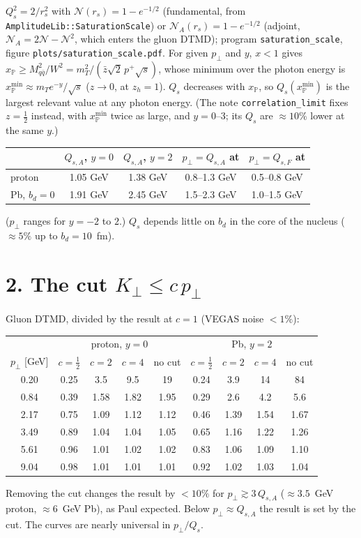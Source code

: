 \documentclass[12pt]{article}
\newcommand{\xpo}{x_{\mathbb{P}}}
\begin{document}
$Q_s^2=2/r_s^2$ with $\mathcal{N}(r_s)=1-e^{-1/2}$ (fundamental, from
\texttt{AmplitudeLib::}\allowbreak\texttt{SaturationScale}) or $\mathcal{N}_A(r_s)=1-e^{-1/2}$ (adjoint, $\mathcal{N}_A=2\mathcal{N}-\mathcal{N}^2$, which enters the
gluon DTMD); program \texttt{saturation\_scale}, figure \texttt{plots/saturation\_scale.pdf}.
For given $p_\perp$ and $y$, $x<1$ gives $\xpo\geq M_{q\bar q}^2/W^2=m_T^2/(\bar z\sqrt2\,p^+\sqrt{s})$, whose
minimum over the photon energy is $\xpo^{\min}\approx m_Te^{-y}/\sqrt{s}$ ($z\to0$, at $z_h=1$). $Q_s$
decreases with $\xpo$, so $Q_s(\xpo^{\min})$ is the largest relevant value at any photon energy. (The note
\texttt{correlation\_limit} fixes $z=\tfrac12$ instead, with $\xpo^{\min}$ twice as large, and $y=0$--3;
its $Q_s$ are $\approx10\%$ lower at the same $y$.)
\begin{center}
\begin{tabular}{lcccc}
\toprule
 & $Q_{s,A}$, $y=0$ & $Q_{s,A}$, $y=2$ & $p_\perp=Q_{s,A}$ at & $p_\perp=Q_{s,F}$ at \\
\midrule
proton     & 1.05 GeV & 1.38 GeV & 0.8--1.3 GeV & 0.5--0.8 GeV \\
Pb, $b_d=0$ & 1.91 GeV & 2.45 GeV & 1.5--2.3 GeV & 1.0--1.5 GeV \\
\bottomrule
\end{tabular}
\end{center}
($p_\perp$ ranges for $y=-2$ to $2$.) $Q_s$ depends little on $b_d$ in the core of the nucleus
($\approx5\%$ up to $b_d=10$~fm).

\section*{2. The cut $K_\perp\leq c\,p_\perp$}

Gluon DTMD, divided by the result at $c=1$ (VEGAS noise $<1\%$):
\begin{center}
\begin{tabular}{c|cccc|cccc}
\toprule
 & \multicolumn{4}{c|}{proton, $y=0$} & \multicolumn{4}{c}{Pb, $y=2$} \\
$p_\perp$ [GeV] & $c=\tfrac12$ & $c=2$ & $c=4$ & no cut & $c=\tfrac12$ & $c=2$ & $c=4$ & no cut \\
\midrule
0.20 & 0.25 & 3.5  & 9.5  & 19   & 0.24 & 3.9  & 14   & 84   \\
0.84 & 0.39 & 1.58 & 1.82 & 1.95 & 0.29 & 2.6  & 4.2  & 5.6  \\
2.17 & 0.75 & 1.09 & 1.12 & 1.12 & 0.46 & 1.39 & 1.54 & 1.67 \\
3.49 & 0.89 & 1.04 & 1.04 & 1.05 & 0.65 & 1.16 & 1.22 & 1.26 \\
5.61 & 0.96 & 1.01 & 1.02 & 1.02 & 0.83 & 1.06 & 1.09 & 1.10 \\
9.04 & 0.98 & 1.01 & 1.01 & 1.01 & 0.92 & 1.02 & 1.03 & 1.04 \\
\bottomrule
\end{tabular}
\end{center}
Removing the cut changes the result by $<10\%$ for $p_\perp\gtrsim3\,Q_{s,A}$ ($\approx3.5$~GeV proton,
$\approx6$~GeV Pb), as Paul expected. Below $p_\perp\approx Q_{s,A}$ the result is set by the cut. The
curves are nearly universal in $p_\perp/Q_s$.
\end{document}
